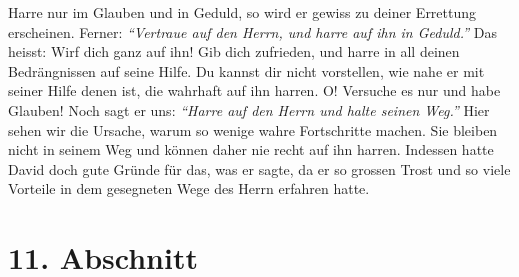 Harre nur im Glauben und in Geduld, so wird er gewiss zu deiner Errettung
erscheinen. Ferner:
\textit{"`Vertraue auf den Herrn, und harre auf ihn in Geduld."'} Das
heisst: Wirf dich ganz auf ihn! Gib dich zufrieden, und harre in all deinen
Bedrängnissen auf seine Hilfe. Du kannst dir nicht vorstellen, wie nahe er mit
seiner Hilfe denen ist, die wahrhaft auf ihn harren. O! Versuche es nur und habe
Glauben! Noch sagt er uns:
\textit{"`Harre auf den Herrn und halte seinen Weg."'}
Hier sehen wir die Ursache, warum so wenige wahre
Fortschritte machen. Sie bleiben nicht in seinem Weg und können daher nie
recht auf ihn harren. Indessen hatte David doch gute Gründe für das, was er
sagte, da er so grossen Trost und so viele Vorteile in dem gesegneten Wege des
Herrn erfahren hatte.

\section{11. Abschnitt} \label{kap6_ab11}

